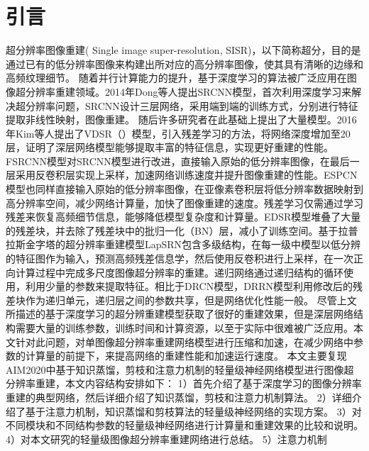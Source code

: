 \documentclass{cjc}
\begin{document}
\maketitle


\section{引言}
%
%
%
%
%
%
超分辨率图像重建( Single image super-resolution, SISR)，以下简称超分，目的是通过已有的低分辨率图像来构建出所对应的高分辨率图像，使其具有清晰的边缘和高频纹理细节。
随着并行计算能力的提升，基于深度学习的算法被广泛应用在图像超分辨率重建领域。2014年Dong等人\cite{srcnn}提出SRCNN模型，首次利用深度学习来解决超分辨率问题，SRCNN设计三层网络，采用端到端的训练方式，分别进行特征提取非线性映射，图像重建。 随后许多研究者在此基础上提出了大量模型。2016年Kim等人\cite{vdsr}提出了VDSR（）模型，引入残差学习的方法，将网络深度增加至20层，证明了深层网络模型能够提取丰富的特征信息，实现更好重建的性能。FSRCNN\cite{fsrcnn}模型对SRCNN模型进行改进，直接输入原始的低分辨率图像，在最后一层采用反卷积层实现上采样，加速网络训练速度并提升图像重建的性能。ESPCN\cite{espcn}模型也同样直接输入原始的低分辨率图像，在亚像素卷积层将低分辨率数据映射到高分辨率空间，减少网络计算量，加快了图像重建的速度。残差学习仅需通过学习残差来恢复高频细节信息，能够降低模型复杂度和计算量。EDSR\cite{edsr}模型堆叠了大量的残差块，并去除了残差块中的批归一化（BN）层，减小了训练空间。基于拉普拉斯金字塔的超分辨率重建模型LapSRN\cite{lapsrn}包含多级结构，在每一级中模型以低分辨的特征图作为输入，预测高频残差信息学，然后使用反卷积进行上采样，在一次正向计算过程中完成多尺度图像超分辨率的重建。递归网络通过递归结构的循环使用，利用少量的参数来提取特征。相比于DRCN模型\cite{drcn}，DRRN\cite{drrn}模型利用修改后的残差块作为递归单元，递归层之间的参数共享，但是网络优化性能一般。
尽管上文所描述的基于深度学习的超分辨重建模型获取了很好的重建效果，但是深层网络结构需要大量的训练参数，训练时间和计算资源，以至于实际中很难被广泛应用。本文针对此问题，对单图像超分辨率重建网络模型进行压缩和加速，在减少网络中参数的计算量的前提下，来提高网络的重建性能和加速运行速度。
本文主要复现AIM2020\cite{aim2020}中基于知识蒸馏，剪枝和注意力机制的轻量级神经网络模型进行图像超分辨率重建，本文内容结构安排如下：
1）首先介绍了基于深度学习的图像分辨率重建的典型网络，然后详细介绍了知识蒸馏，剪枝和注意力机制算法。
2）详细介绍了基于注意力机制，知识蒸馏和剪枝算法的轻量级神经网络的实现方案。
3）对不同模块和不同结构参数的轻量级神经网络进行计算量和重建效果的比较和说明。
4）对本文研究的轻量级图像超分辨率重建网络进行总结。
5）注意力机制
\end{document}

